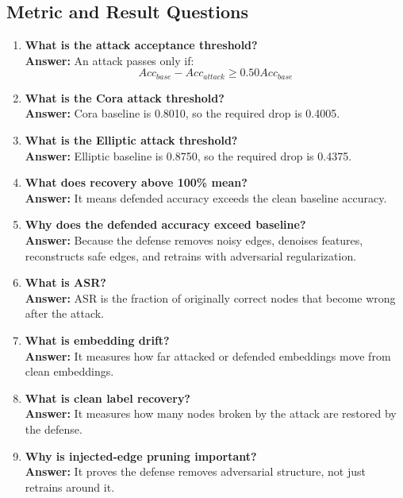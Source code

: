 \documentclass[12pt,a4paper]{article}
\begin{document}
\subsection{Metric and Result Questions}
\begin{enumerate}[label=\textbf{Q\arabic*.},resume]
    \item \textbf{What is the attack acceptance threshold?}\\
    \textbf{Answer:} An attack passes only if:
    $$
    Acc_{base}-Acc_{attack}\geq0.50Acc_{base}
    $$

    \item \textbf{What is the Cora attack threshold?}\\
    \textbf{Answer:} Cora baseline is 0.8010, so the required drop is 0.4005.

    \item \textbf{What is the Elliptic attack threshold?}\\
    \textbf{Answer:} Elliptic baseline is 0.8750, so the required drop is 0.4375.

    \item \textbf{What does recovery above 100\% mean?}\\
    \textbf{Answer:} It means defended accuracy exceeds the clean baseline accuracy.

    \item \textbf{Why does the defended accuracy exceed baseline?}\\
    \textbf{Answer:} Because the defense removes noisy edges, denoises features, reconstructs safe edges, and retrains with adversarial regularization.

    \item \textbf{What is ASR?}\\
    \textbf{Answer:} ASR is the fraction of originally correct nodes that become wrong after the attack.

    \item \textbf{What is embedding drift?}\\
    \textbf{Answer:} It measures how far attacked or defended embeddings move from clean embeddings.

    \item \textbf{What is clean label recovery?}\\
    \textbf{Answer:} It measures how many nodes broken by the attack are restored by the defense.

    \item \textbf{Why is injected-edge pruning important?}\\
    \textbf{Answer:} It proves the defense removes adversarial structure, not just retrains around it.


\end{enumerate}
\end{document}
